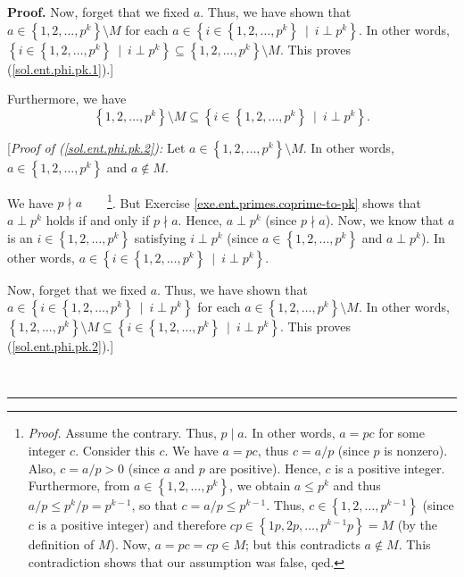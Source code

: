 \documentclass[numbers=enddot,12pt,final,onecolumn,notitlepage]{scrartcl}%
\numberwithin{exer}{subsection}
\theoremstyle{definition}
\newenvironment{fineprint}{\begin{small}}{\end{small}}
\newenvironment{proof}[1][Proof]{\noindent\textbf{#1.} }{\ \rule{0.5em}{0.5em}}
\begin{document}
\begin{fineprint}
\begin{proof}
Now, forget that we fixed $a$. Thus, we have shown that $a\in\left\{
1,2,\ldots,p^{k}\right\}  \setminus M$ for each $a\in\left\{  i\in\left\{
1,2,\ldots,p^{k}\right\}  \ \mid\ i\perp p^{k}\right\}  $. In other words,
$\left\{  i\in\left\{  1,2,\ldots,p^{k}\right\}  \ \mid\ i\perp p^{k}\right\}
\subseteq\left\{  1,2,\ldots,p^{k}\right\}  \setminus M$. This proves
(\ref{sol.ent.phi.pk.1}).]

Furthermore, we have%
\begin{equation}
\left\{  1,2,\ldots,p^{k}\right\}  \setminus M\subseteq\left\{  i\in\left\{
1,2,\ldots,p^{k}\right\}  \ \mid\ i\perp p^{k}\right\}  .
\label{sol.ent.phi.pk.2}%
\end{equation}


[\textit{Proof of (\ref{sol.ent.phi.pk.2}):} Let $a\in\left\{  1,2,\ldots
,p^{k}\right\}  \setminus M$. In other words, $a\in\left\{  1,2,\ldots
,p^{k}\right\}  $ and $a\notin M$.

We have $p\nmid a$\ \ \ \ \footnote{\textit{Proof.} Assume the contrary. Thus,
$p\mid a$. In other words, $a=pc$ for some integer $c$. Consider this $c$. We
have $a=pc$, thus $c=a/p$ (since $p$ is nonzero). Also, $c=a/p>0$ (since $a$
and $p$ are positive). Hence, $c$ is a positive integer. Furthermore, from
$a\in\left\{  1,2,\ldots,p^{k}\right\}  $, we obtain $a\leq p^{k}$ and thus
$a/p\leq p^{k}/p=p^{k-1}$, so that $c=a/p\leq p^{k-1}$. Thus, $c\in\left\{
1,2,\ldots,p^{k-1}\right\}  $ (since $c$ is a positive integer) and therefore
$cp\in\left\{  1p,2p,\ldots,p^{k-1}p\right\}  =M$ (by the definition of $M$).
Now, $a=pc=cp\in M$; but this contradicts $a\notin M$. This contradiction
shows that our assumption was false, qed.}. But Exercise
\ref{exe.ent.primes.coprime-to-pk} shows that $a\perp p^{k}$ holds if and only
if $p\nmid a$. Hence, $a\perp p^{k}$ (since $p\nmid a$). Now, we know that $a$
is an $i\in\left\{  1,2,\ldots,p^{k}\right\}  $ satisfying $i\perp p^{k}$
(since $a\in\left\{  1,2,\ldots,p^{k}\right\}  $ and $a\perp p^{k}$). In other
words, $a\in\left\{  i\in\left\{  1,2,\ldots,p^{k}\right\}  \ \mid\ i\perp
p^{k}\right\}  $.

Now, forget that we fixed $a$. Thus, we have shown that $a\in\left\{
i\in\left\{  1,2,\ldots,p^{k}\right\}  \ \mid\ i\perp p^{k}\right\}  $ for
each $a\in\left\{  1,2,\ldots,p^{k}\right\}  \setminus M$. In other words,
$\left\{  1,2,\ldots,p^{k}\right\}  \setminus M\subseteq\left\{  i\in\left\{
1,2,\ldots,p^{k}\right\}  \ \mid\ i\perp p^{k}\right\}  $. This proves
(\ref{sol.ent.phi.pk.2}).]


\end{proof}
\end{fineprint}
\end{document}
